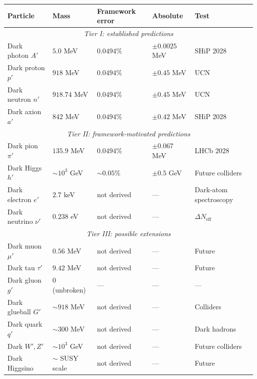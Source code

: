 \documentclass[a4paper,1pt,oneside,openany]{book}
\begin{document}
\begin{table}[htbp]
\centering
\small
\renewcommand{\arraystretch}{1.3}
\begin{tabular}{@{}p{}p{}p{}p{}p{}@{}}
\toprule
Particle & Mass & Framework error & Absolute & Test \\
\midrule
\multicolumn{5}{c}{\textit{Tier I: established predictions}} \\
\midrule
Dark photon $A'$   & $5.0$ MeV        & $0.0494\%$ & $\pm 0.0025$ MeV & SHiP 2028 \\
Dark proton $p'$   & $918$ MeV        & $0.0494\%$ & $\pm 0.45$ MeV   & UCN \\
Dark neutron $n'$  & $918.74$ MeV     & $0.0494\%$ & $\pm 0.45$ MeV   & UCN \\
Dark axion $a'$    & $842$ MeV        & $0.0494\%$ & $\pm 0.42$ MeV   & SHiP 2028 \\
\midrule
\multicolumn{5}{c}{\textit{Tier II: framework-motivated predictions}} \\
\midrule
Dark pion $\pi'$   & $135.9$ MeV      & $0.0494\%$ & $\pm 0.067$ MeV  & LHCb 2028 \\
Dark Higgs $h'$    & $\sim 10^{3}$ GeV& $\sim 0.05\%$ & $\pm 0.5$ GeV & Future colliders \\
Dark electron $e'$ & $2.7$ keV        & not derived & ---           & Dark-atom spectroscopy \\
Dark neutrino $\nu'$ & $0.238$ eV     & not derived & ---           & $\Delta N_{\text{eff}}$ \\
\midrule
\multicolumn{5}{c}{\textit{Tier III: possible extensions}} \\
\midrule
Dark muon $\mu'$   & $0.56$ MeV       & not derived & ---           & Future \\
Dark tau $\tau'$   & $9.42$ MeV       & not derived & ---           & Future \\
Dark gluon $g'$    & $0$ (unbroken)   & ---         & ---           & --- \\
Dark glueball $G'$ & $\sim 918$ MeV   & not derived & ---           & Colliders \\
Dark quark $q'$    & $\sim 300$ MeV   & not derived & ---           & Dark hadrons \\
Dark $W', Z'$      & $\sim 10^{3}$ GeV& not derived & ---           & Future colliders \\
Dark Higgsino      & $\sim$ SUSY scale& not derived & ---           & Future \\

\end{tabular}
\end{table}
\end{document}
